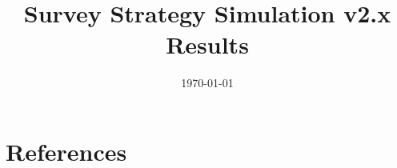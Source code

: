 \documentclass[modern]{aastex62}
\begin{document}

\date{\today}
\title{Survey Strategy Simulation v2.x Results}






\appendix

\section{References} \label{sec:bib}


\end{document}
